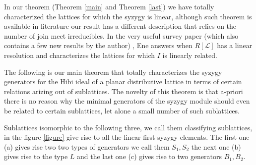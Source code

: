 \documentclass[10pt,reqno]{amsart}
\numberwithin{equation}{section}
\begin{document}
In our theorem (Theorem \ref{main} and Theorem \ref{last}) we have totally characterized the lattices for which the syzygy is linear, although such theorem is available in literature \cite{ene_syzygies} our result has a different description that relies on the number of join meet irreducibles. In the very useful survey paper (which also contains a few new results by the author) \cite{ene_syzygies}, Ene answers when $R[\mathcal{L}]$ has a linear resolution and characterizes the lattices for which $I$ is linearly related. 

The following is our main theorem that totally characterizes the syzygy generators for the Hibi ideal of a planar distributive lattice in terms of certain relations arizing out of sublattices. The novelty of this theorem is that a-priori there is no reason why the minimal generators of the syzygy module should even be related to certain sublattices, let alone a small number of such sublattices. 

Sublattices isomorphic to the following three, we call them classifying sublattices, in the figure \ref{figure} give rise to all the linear first syzygy elements. The first one (a) gives rise two two types of generators we call them $S_1,S_2$ the next one (b) gives rise to the type $L$ and the last one (c) gives rise to two generators $B_1,B_2$. 
\end{document}
